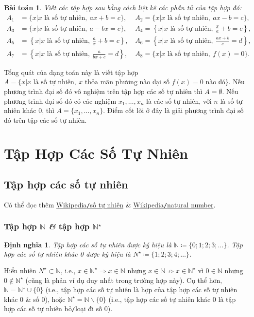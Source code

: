 \documentclass[oneside]{book}
\numberwithin{equation}{section}
\newtheorem{dinhnghia}{Định nghĩa}[section]
\newtheorem{baitoan}{Bài toán}[section]
\begin{document}
\begin{baitoan}
	Viết các tập hợp sau bằng cách liệt kê các phần tử của tập hợp đó:
	\begin{align*}
		A_1 &= \{x|x\mbox{ là số tự nhiên},\ ax + b = c\},\ && A_2 = \{x|x\mbox{ là số tự nhiên},\ ax - b = c\},\\
		A_3 &= \{x|x\mbox{ là số tự nhiên},\ a - bx = c\},\ && A_4 = \left\{x|x\mbox{ là số tự nhiên},\ \frac{x}{a} + b = c\right\},\\
		A_5 &= \left\{x|x\mbox{ là số tự nhiên},\ \frac{a}{x} + b = c\right\},\ && A_6 = \left\{x|x\mbox{ là số tự nhiên},\ \frac{ax + b}{c} = d\right\},\\
		A_7 &= \left\{x|x\mbox{ là số tự nhiên},\ \frac{a}{bx + c} = d\right\},\ && A_8 = \{x|x\mbox{ là số tự nhiên},\ f(x) = 0\}.
	\end{align*}
\end{baitoan}
Tổng quát của dạng toán này là viết tập hợp $A = \{x|x\mbox{ là số tự nhiên},\ x \mbox{ thỏa mãn phương nào đại số }f(x) = 0\mbox{ nào đó}\}$. Nếu phương trình đại số đó vô nghiệm trên tập hợp các số tự nhiên thì $A = \emptyset$. Nếu phương trình đại số đó có các nghiệm $x_1,\ldots,x_n$ là các số tự nhiên, với $n$ là số tự nhiên khác 0, thì $A = \{x_1,\ldots,x_n\}$. Điểm cốt lõi ở đây là giải phương trình đại số đó trên tập các số tự nhiên.

\section{Tập Hợp Các Số Tự Nhiên}

\subsection{Tập hợp các số tự nhiên}
Có thể đọc thêm \href{https://vi.wikipedia.org/wiki/S%E1%BB%91_t%E1%BB%B1_nhi%C3%AAn}{Wikipedia\texttt{/}số tự nhiên} \& \href{https://en.wikipedia.org/wiki/Natural_number}{Wikipedia\texttt{/}natural number}.

\subsubsection{Tập hợp $\mathbb{N}$ \textit{\&} tập hợp $\mathbb{N}^\star$}
\begin{dinhnghia}
	\emph{Tập hợp các số tự nhiên} được ký hiệu là $\mathbb{N}\coloneqq\{0;1;2;3;\ldots\}$. \emph{Tập hợp các số tự nhiên khác 0} được ký hiệu là $N^\star\coloneqq\{1;2;3;4;\ldots\}$.
\end{dinhnghia}
Hiển nhiên $N^\star\subset\mathbb{N}$, i.e., $x\in\mathbb{N}^\star\Rightarrow x\in\mathbb{N}$ nhưng $x\in\mathbb{N}\not\Rightarrow x\in\mathbb{N}^\star$ vì $0\in\mathbb{N}$ nhưng $0\notin\mathbb{N}^\star$ (cũng là phản ví dụ duy nhất trong trường hợp này). Cụ thể hơn, $\mathbb{N} = \mathbb{N}^\star\cup\{0\}$ (i.e., tập hợp các số tự nhiên là hợp của tập hợp các số tự nhiên khác 0 \& số 0), hoặc $\mathbb{N}^\star = \mathbb{N}\backslash\{0\}$ (i.e., tập hợp các số tự nhiên khác 0 là tập hợp các số tự nhiên bỏ\texttt{/}loại đi số 0).
\end{document}
